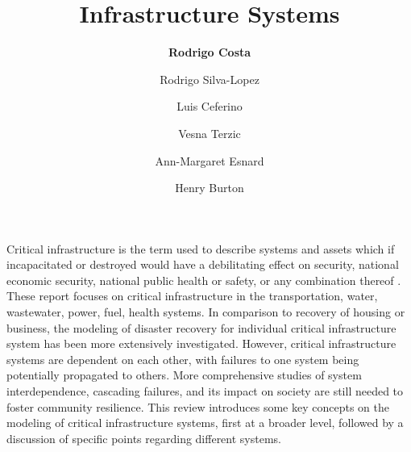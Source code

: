 \title{Infrastructure Systems}
\author{
    \textbf{Rodrigo Costa}
    \and Rodrigo Silva-Lopez 
    \and Luis Ceferino 
    \and{Vesna Terzic}
    \and{Ann-Margaret Esnard}
    \and{Henry Burton}}
\tocauthor{}
%
%
\maketitle
Critical infrastructure is the term used to describe systems and assets which if incapacitated or destroyed would have a debilitating effect on security, national economic security, national public health or safety, or any combination thereof \citep{DHS_CI}. These report focuses on critical infrastructure in the transportation, water, wastewater, power, fuel, health systems. In comparison to recovery of housing or business, the modeling of disaster recovery for individual critical infrastructure system has been more extensively investigated. However, critical infrastructure systems are dependent on each other, with failures to one system being potentially propagated to others. More comprehensive studies of system interdependence, cascading failures, and its impact on society are still needed to foster community resilience. This review introduces some key concepts on the modeling of critical infrastructure systems, first at a broader level, followed by a discussion of specific points regarding different systems.\ 

\FloatBarrier
